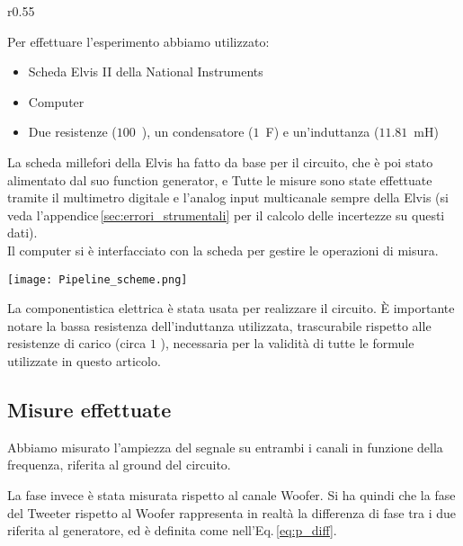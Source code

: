 \documentclass[../Relazione_circuiti]{subfiles}
\begin{document}
\begin{wrapfigure}{r}{0.55\textwidth}

\end{wrapfigure}

\begin{minipage}{.44\textwidth}

  Per effettuare l'esperimento abbiamo utilizzato:
  \begin{itemize}
    \item Scheda Elvis II della National Instruments
    \item Computer
    \item Due resistenze ($100$~\textOmega), un condensatore ($1$~\textmu F) e un'induttanza ($11.81$~mH)
  \end{itemize}

  La scheda millefori della Elvis ha fatto da base per il circuito, che è poi stato alimentato dal suo function
  generator, e Tutte le misure sono state effettuate tramite il multimetro digitale e l'analog input multicanale sempre
  della Elvis (si veda l'appendice\,\ref{sec:errori_strumentali} per il calcolo delle incertezze su questi dati).\\
  Il computer si è interfacciato con la scheda per gestire le operazioni di misura.
\end{minipage}
\hfill
\begin{minipage}{0.55\textwidth}
  \centering
  \texttt{[image: Pipeline\_scheme.png]}
\end{minipage}
La componentistica elettrica è stata usata per realizzare il circuito.
È importante notare la bassa resistenza dell'induttanza utilizzata, trascurabile rispetto alle resistenze di carico
(circa $1$ \textOmega), necessaria per la validità di tutte le formule utilizzate in questo articolo.

\subsection{Misure effettuate}
  Abbiamo misurato l'ampiezza del segnale su entrambi i canali in funzione della frequenza, riferita al ground del
  circuito.

  La fase invece è stata misurata rispetto al canale Woofer.
  Si ha quindi che la fase del Tweeter rispetto al Woofer rappresenta in realtà la differenza di fase tra i due riferita
  al generatore, ed è definita come nell'Eq.\,\eqref{eq:p_diff}.
\end{document}
